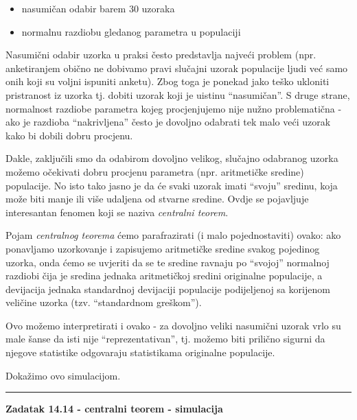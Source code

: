 \documentclass[]{book}
\providecommand{\tightlist}{%
  \setlength{\itemsep}{0pt}\setlength{\parskip}{0pt}}
\theoremstyle{definition}
\theoremstyle{definition}
\theoremstyle{definition}
\theoremstyle{remark}
\begin{document}
\begin{itemize}
\tightlist
\item
  nasumičan odabir barem 30 uzoraka
\item
  normalnu razdiobu gledanog parametra u populaciji
\end{itemize}

Nasumični odabir uzorka u praksi često predstavlja najveći problem (npr.
anketiranjem obično ne dobivamo pravi slučajni uzorak populacije ljudi
već samo onih koji su voljni ispuniti anketu). Zbog toga je ponekad jako
teško ukloniti pristranost iz uzorka tj. dobiti uzorak koji je uistinu
``nasumičan''. S druge strane, normalnost razdiobe parametra kojeg
procjenjujemo nije nužno problematična - ako je razdioba ``nakrivljena''
često je dovoljno odabrati tek malo veći uzorak kako bi dobili dobru
procjenu.

Dakle, zaključili smo da odabirom dovoljno velikog, slučajno odabranog
uzorka možemo očekivati dobru procjenu parametra (npr. aritmetičke
sredine) populacije. No isto tako jasno je da će svaki uzorak imati
``svoju'' sredinu, koja može biti manje ili više udaljena od stvarne
sredine. Ovdje se pojavljuje interesantan fenomen koji se naziva
\emph{centralni teorem}.

Pojam \emph{centralnog teorema} ćemo parafrazirati (i malo
pojednostaviti) ovako: ako ponavljamo uzorkovanje i zapisujemo
aritmetičke sredine svakog pojedinog uzorka, onda ćemo se uvjeriti da se
te sredine ravnaju po ``svojoj'' normalnoj razdiobi čija je sredina
jednaka aritmetičkoj sredini originalne populacije, a devijacija jednaka
standardnoj devijaciji populacije podijeljenoj sa korijenom veličine
uzorka (tzv. ``standardnom greškom'').

Ovo možemo interpretirati i ovako - za dovoljno veliki nasumični uzorak
vrlo su male šanse da isti nije ``reprezentativan'', tj. možemo biti
prilično sigurni da njegove statistike odgovaraju statistikama
originalne populacije.

Dokažimo ovo simulacijom.

\begin{center}\rule{0.5\linewidth}{\linethickness}\end{center}

\textbf{Zadatak 14.14 - centralni teorem - simulacija}
\end{document}

